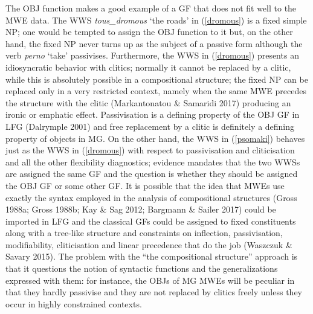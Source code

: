 \documentclass[output=paper,
modfonts
]{langscibook}
\begin{document}
The OBJ function makes a good example of a GF that does not fit well to the MWE data. The WWS \textit{tous\_dromous} `the roads' in (\ref{dromous}) is a fixed simple NP; one would be tempted to assign the OBJ function to it but, on the other hand, the fixed NP never turns up as the subject of a passive form although the verb \textit{perno} `take' passivises. Furthermore, the WWS in (\ref{dromous}) presents an idiosyncratic behavior with clitics; normally it cannot be replaced by a clitic, while this is absolutely possible in a compositional structure; the fixed NP can be replaced only in a very restricted context, namely when the same MWE precedes the structure with the clitic (Markantonatou \& Samaridi 2017)  producing an ironic or emphatic effect. Passivisation is a defining property of the OBJ GF in LFG (Dalrymple 2001) and free replacement by a clitic is definitely a defining property of objects in MG. On the other hand, the WWS in (\ref{psomaki}) behaves just as the WWS in (\ref{dromous}) with respect to passivisation and cliticisation and all the other flexibility diagnostics; evidence mandates that the two WWSs are assigned the same GF and the question is whether they should be assigned the OBJ GF or some other GF.  It is possible that the idea that MWEs use exactly the syntax employed in the analysis of compositional structures (Gross 1988a; Gross 1988b; Kay \& Sag 2012; Bargmann \& Sailer 2017) could be imported in LFG and the classical GFs could be assigned to fixed constituents along with a tree-like structure and constraints on inflection, passivisation, modifiability, cliticisation and linear precedence that do the job (Waszczuk \& Savary 2015). The problem with the  ``the compositional structure” approach is that it questions the notion of syntactic functions and the generalizations expressed with them: for instance, the OBJs of MG MWEs will be peculiar in that they hardly passivise and they are not replaced by clitics freely unless they occur in highly constrained contexts. 
\end{document}
